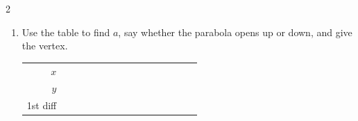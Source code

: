 \documentclass[11pt]{article}
\begin{document}
\begin{recapbox}
\begin{multicols}{2}
\begin{enumerate}[leftmargin=*,itemsep=3pt]
\begin{center}
\begin{tabular}
\end{tabular}\end{center}
  \item Use the table to find $a$, say whether the parabola opens up or down, and give the vertex.
\begin{center}\renewcommand{\arraystretch}{1.15}\setlength{\tabcolsep}{2pt}\begin{tabular}{r|>{\centering\arraybackslash}p{0.62cm}>{\centering\arraybackslash}p{0.62cm}>{\centering\arraybackslash}p{0.62cm}>{\centering\arraybackslash}p{0.62cm}>{\centering\arraybackslash}p{0.62cm}>{\centering\arraybackslash}p{0.62cm}>{\centering\arraybackslash}p{0.62cm}>{\centering\arraybackslash}p{0.62cm}>{\centering\arraybackslash}p{0.62cm}>{\centering\arraybackslash}p{0.62cm}>{\centering\arraybackslash}p{0.62cm}>{\centering\arraybackslash}p{0.62cm}>{\centering\arraybackslash}p{0.62cm}>{\centering\arraybackslash}p{0.62cm}}
$x$ & \multicolumn{2}{c}{\colorbox{iagreen}{\makebox[1.12cm]{\strut \color{white}\bfseries $0$}}} & \multicolumn{2}{c}{\colorbox{iagreen}{\makebox[1.12cm]{\strut \color{white}\bfseries $1$}}} & \multicolumn{2}{c}{\colorbox{iagreen}{\makebox[1.12cm]{\strut \color{white}\bfseries $2$}}} & \multicolumn{2}{c}{\colorbox{iagreen}{\makebox[1.12cm]{\strut \color{white}\bfseries $3$}}} & \multicolumn{2}{c}{\colorbox{iagreen}{\makebox[1.12cm]{\strut \color{white}\bfseries $4$}}} & \multicolumn{2}{c}{\colorbox{iagreen}{\makebox[1.12cm]{\strut \color{white}\bfseries $5$}}} & \multicolumn{2}{c}{\colorbox{iagreen}{\makebox[1.12cm]{\strut \color{white}\bfseries $6$}}} \\[2pt]
$y$ & \multicolumn{2}{c}{\colorbox{keybg}{\makebox[1.12cm]{\strut $-4$}}} & \multicolumn{2}{c}{\colorbox{keybg}{\makebox[1.12cm]{\strut $1$}}} & \multicolumn{2}{c}{\colorbox{keybg}{\makebox[1.12cm]{\strut $4$}}} & \multicolumn{2}{c}{\colorbox{keybg}{\makebox[1.12cm]{\strut $5$}}} & \multicolumn{2}{c}{\colorbox{keybg}{\makebox[1.12cm]{\strut $4$}}} & \multicolumn{2}{c}{\colorbox{keybg}{\makebox[1.12cm]{\strut $1$}}} & \multicolumn{2}{c}{\colorbox{keybg}{\makebox[1.12cm]{\strut $-4$}}} \\[2pt]
\textcolor{exblue}{\scriptsize 1st diff} & & \multicolumn{2}{c}{\colorbox{exbg}{\makebox[1.12cm]{\strut \textcolor{exblue}{$+5$}}}} & \multicolumn{2}{c}{\colorbox{exbg}{\makebox[1.12cm]{\strut \textcolor{exblue}{$+3$}}}} & \multicolumn{2}{c}{\colorbox{exbg}{\makebox[1.12cm]{\strut \textcolor{exblue}{$+1$}}}} & \multicolumn{2}{c}{\colorbox{exbg}{\makebox[1.12cm]{\strut \textcolor{exblue}{$-1$}}}} & \multicolumn{2}{c}{\colorbox{exbg}{\makebox[1.12cm]{\strut \textcolor{exblue}{$-3$}}}} & \multicolumn{2}{c}{\colorbox{exbg}{\makebox[1.12cm]{\strut \textcolor{exblue}{$-5$}}}} & \\[2pt]

\end{tabular}
\end{center}
\end{enumerate}
\end{multicols}
\end{recapbox}
\end{document}
